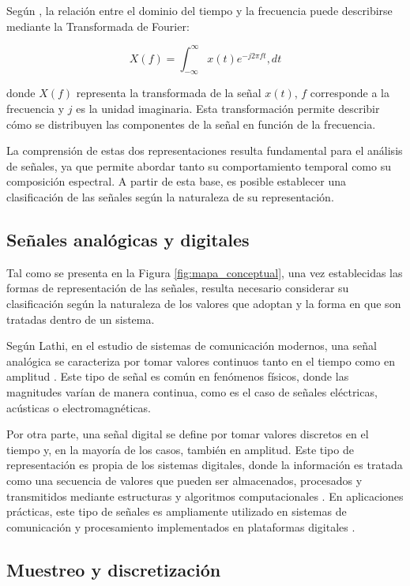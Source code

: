 Según \cite{oppenheim1997}, la relación entre el dominio del tiempo y la frecuencia puede describirse mediante la Transformada de Fourier:

\begin{equation}
X(f) = \int_{-\infty}^{\infty} x(t)e^{-j2\pi ft} , dt
\label{eq:fourier}
\end{equation}

donde $X(f)$ representa la transformada de la señal $x(t)$, $f$ corresponde a la frecuencia y $j$ es la unidad imaginaria. Esta transformación permite describir cómo se distribuyen las componentes de la señal en función de la frecuencia.

La comprensión de estas dos representaciones resulta fundamental para el análisis de señales, ya que permite abordar tanto su comportamiento temporal como su composición espectral. A partir de esta base, es posible establecer una clasificación de las señales según la naturaleza de su representación.

\subsection{Señales analógicas y digitales}

Tal como se presenta en la Figura \ref{fig:mapa_conceptual}, una vez establecidas las formas de representación de las señales, resulta necesario considerar su clasificación según la naturaleza de los valores que adoptan y la forma en que son tratadas dentro de un sistema.

Según Lathi, en el estudio de sistemas de comunicación modernos, una señal analógica se caracteriza por tomar valores continuos tanto en el tiempo como en amplitud \cite{lathi2009modern}. Este tipo de señal es común en fenómenos físicos, donde las magnitudes varían de manera continua, como es el caso de señales eléctricas, acústicas o electromagnéticas.

Por otra parte, una señal digital se define por tomar valores discretos en el tiempo y, en la mayoría de los casos, también en amplitud. Este tipo de representación es propia de los sistemas digitales, donde la información es tratada como una secuencia de valores que pueden ser almacenados, procesados y transmitidos mediante estructuras y algoritmos computacionales \cite{proakis2007digital}. En aplicaciones prácticas, este tipo de señales es ampliamente utilizado en sistemas de comunicación y procesamiento implementados en plataformas digitales \cite{stm32_comm}.

\subsection{Muestreo y discretización}

